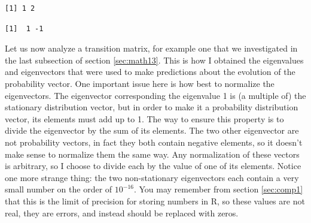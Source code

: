 \documentclass[
  letterpaper,
  DIV=11,
  numbers=noendperiod]{scrreprt}
\newenvironment{Shaded}{\begin{snugshade}}{\end{snugshade}}
\newcommand{\DecValTok}[1]{\textcolor[rgb]{0.68,0.00,0.00}{#1}}
\newcommand{\FunctionTok}[1]{\textcolor[rgb]{0.28,0.35,0.67}{#1}}
\newcommand{\NormalTok}[1]{\textcolor[rgb]{0.00,0.23,0.31}{#1}}
\newcommand{\OtherTok}[1]{\textcolor[rgb]{0.00,0.23,0.31}{#1}}
\newcommand{\SpecialCharTok}[1]{\textcolor[rgb]{0.37,0.37,0.37}{#1}}
\begin{document}
\begin{Shaded}
\end{Shaded}

\begin{verbatim}
[1] 1 2
\end{verbatim}

\begin{Shaded}
\end{Shaded}

\begin{verbatim}
[1]  1 -1
\end{verbatim}

Let us now analyze a transition matrix, for example one that we
investigated in the last subsection of section \ref{sec:math13}. This is
how I obtained the eigenvalues and eigenvectors that were used to make
predictions about the evolution of the probability vector. One important
issue here is how best to normalize the eigenvectors. The eigenvector
corresponding the eigenvalue 1 is (a multiple of) the stationary
distribution vector, but in order to make it a probability distribution
vector, its elements must add up to 1. The way to ensure this property
is to divide the eigenvector by the sum of its elements. The two other
eigenvector are not probability vectors, in fact they both contain
negative elements, so it doesn't make sense to normalize them the same
way. Any normalization of these vectors is arbitrary, so I choose to
divide each by the value of one of its elements. Notice one more strange
thing: the two non-stationary eigenvectors each contain a very small
number on the order of \(10^{-16}\). You may remember from section
\ref{sec:comp1} that this is the limit of precision for storing numbers
in R, so these values are not real, they are errors, and instead should
be replaced with zeros.
\end{document}
